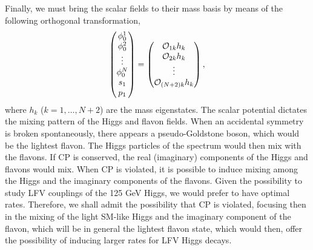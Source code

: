 \documentclass[aps,prd,groupaddress,floatfix,tighten,nofootinbib,showpacs,
amsfonts,superscriptaddress]{revtex4}
\begin{document}
Finally, we must bring the scalar fields to their mass basis by means of the following orthogonal transformation, 
%
\begin{eqnarray}
		\begin{pmatrix}
			\phi_0^1  \\
			\phi_0^2 \\
			\vdots \\
			\phi_0^N \\
			s_1 \\
			p_1 
		\end{pmatrix}
		= \begin{pmatrix}
			{\cal O}_{1k} h_k \\
			{\cal O}_{2k} h_k \\
			\vdots	\\
			{\cal O}_{(N+2)k} h_k
		\end{pmatrix},
\end{eqnarray}
%
where $h_k$ ($k=1, \dots, N+2$) are the mass eigenstates.
The scalar potential dictates the mixing pattern of the Higgs and flavon fields. When an accidental symmetry is broken 
spontaneously, there appears a pseudo-Goldstone boson, which would be the lightest flavon. The Higgs particles of the 
spectrum would then mix with the flavons. If CP is conserved, the real (imaginary) components of the Higgs and flavons
would mix. When CP is violated, it is possible to induce mixing among the Higgs and the imaginary components of the flavons. 
Given the possibility to study LFV couplings of the 125 GeV Higgs, we would prefer  to have optimal rates. 
Therefore, we shall admit the possibility that CP is violated, focusing then in the mixing of the light SM-like Higgs 
and the imaginary component of the flavon, which will be in general the lightest flavon state, which would then, 
offer the possibility of inducing larger rates for LFV Higgs decays.
	
\end{document}
